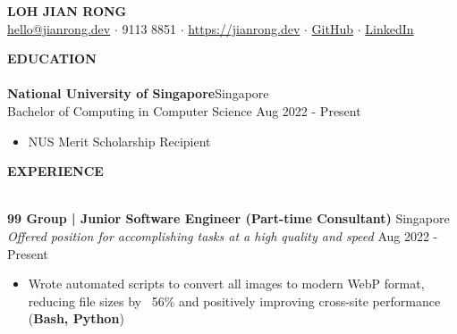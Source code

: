 \documentclass[a4paper]{article}
\newcommand{\lineunder} {
    \vspace*{-8pt} \\
    \hspace*{-12pt} \hrulefill \\
}
\newcommand{\header} [1] {
    {\hspace*{-12pt}\vspace*{6pt} \large\textbf{#1}}
    \vspace*{-6pt} \lineunder
}
\begin{document}
\begin{center}
	{\huge \scshape \textbf{LOH JIAN RONG}}\\
	\href{mailto:hello@jianrong.dev}{hello@jianrong.dev} $\cdot$ 9113 8851 $\cdot$ \href{https://jianrong.dev}{https://jianrong.dev} $\cdot$ \href{https://github.com/jianrong7}{GitHub} $\cdot$ \href{https://www.linkedin.com/in/jianrong7/}{LinkedIn}\\
\end{center}

\header{EDUCATION}
\vspace{1mm}
\textbf{National University of Singapore}\hfill Singapore\\
Bachelor of Computing in Computer Science \hfill Aug 2022 - Present\\
\vspace{-2mm}
\begin{itemize} \itemsep 1pt
	\item NUS Merit Scholarship Recipient
\end{itemize}

\header{EXPERIENCE}
\vspace{1mm}

\textbf{99 Group | Junior Software Engineer (Part-time Consultant)} \hfill Singapore\\
\textit{Offered position for accomplishing tasks at a high quality and speed} \hfill Aug 2022 - Present\\
\vspace{-2mm}
\begin{itemize} \itemsep 1pt
    \item Wrote automated scripts to convert all images to modern WebP format, reducing file sizes by ~56\% and positively improving cross-site performance (\textbf{Bash, Python})
\end{itemize}
\end{document}
